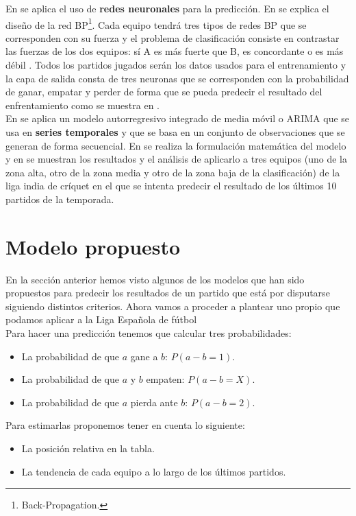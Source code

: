 En \cite{refpred2} se aplica el uso de \textbf{redes neuronales} para la predicción. En \cite[Section 2.1.]{refpred2} se explica el diseño de la red BP\footnote{Back-Propagation.}. Cada equipo tendrá tres tipos de redes BP que se corresponden con su fuerza y el problema de clasificación consiste en contrastar las fuerzas de los dos equipos: sí A es más fuerte que B, es concordante o es más débil \cite[Section 2.2.]{refpred2}. Todos los partidos jugados serán los datos usados para el entrenamiento \cite[Section 3.1.]{refpred2} y la capa de salida consta de tres neuronas que se corresponden con la probabilidad de ganar, empatar y perder \cite[Section 3.2.]{refpred2} de forma que se pueda predecir el resultado del enfrentamiento como se muestra en \cite[Section 3.4.]{refpred2}.\\

En \cite{refpred3} se aplica un modelo autorregresivo integrado de media móvil o ARIMA que se usa en \textbf{series temporales} y que se basa en un conjunto de observaciones que se generan de forma secuencial. En \cite[Section E]{refpred3} se realiza la formulación matemática del modelo y en \cite[Section F]{refpred3} se muestran los resultados y el análisis de aplicarlo a tres equipos (uno de la zona alta, otro de la zona media y otro de la zona baja de la clasificación) de la liga india de críquet en el que se intenta predecir el resultado de los últimos 10 partidos de la temporada.\\

\section{Modelo propuesto}
En la sección anterior hemos visto algunos de los modelos que han sido propuestos para predecir los resultados de un partido que está por disputarse siguiendo distintos criterios. Ahora vamos a proceder a plantear uno propio que podamos aplicar a la Liga Española de fútbol \\

Para hacer una predicción tenemos que calcular tres probabilidades:
\begin{itemize}
	\item La probabilidad de que $a$ gane a $b$: $P(a-b=1)$.
	\item La probabilidad de que $a$ y $b$ empaten: $P(a-b=X)$.
	\item La probabilidad de que $a$ pierda ante $b$: $P(a-b=2)$.
\end{itemize}
Para estimarlas proponemos tener en cuenta lo siguiente:
\begin{itemize}
	\item La posición relativa en la tabla.
	\item La tendencia de cada equipo a lo largo de los últimos partidos.
\end{itemize}

